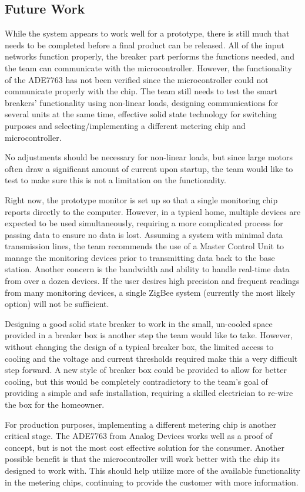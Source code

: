 \subsection{Future Work}
While the system appears to work well for a prototype, there is still much that needs to be completed before a final product can be released. All of the input networks function properly, the breaker part performs the functions needed, and the team can communicate with the microcontroller. However, the functionality of the ADE7763 has not been verified since the microcontroller could not communicate properly with the chip. The team still needs to test the smart breakers' functionality using non-linear loads, designing communications for several units at the same time, effective solid state technology for switching purposes and selecting/implementing a different metering chip and microcontroller. 

No adjustments should be necessary for non-linear loads, but since large motors often draw a significant amount of current upon startup, the team would like to test to make sure this is not a limitation on the functionality.

Right now, the prototype monitor is set up so that a single monitoring chip reports directly to the computer. However, in a typical home, multiple devices are expected to be used simultaneously, requiring a more complicated process for passing data to ensure no data is lost. Assuming a system with minimal data transmission lines, the team recommends the use of a Master Control Unit to manage the monitoring devices prior to transmitting data back to the base station. Another concern is the bandwidth and ability to handle real-time data from over a dozen devices. If the user desires high precision and frequent readings from many monitoring devices, a single ZigBee system (currently the most likely option) will not be sufficient.

Designing a good solid state breaker to work in the small, un-cooled space provided in a breaker box is another step the team would like to take. However, without changing the design of a typical breaker box, the limited access to cooling and the voltage and current thresholds required make this a very difficult step forward. A new style of breaker box could be provided to allow for better cooling, but this would be completely contradictory to the team's goal of providing a simple and safe installation, requiring a skilled electrician to re-wire the box for the homeowner. 
 
For production purposes, implementing a different metering chip is another critical stage. The ADE7763 from Analog Devices works well as a proof of concept, but is not the most cost effective solution for the consumer. Another possible benefit is that the microcontroller will work better with the chip its designed to work with. This should help utilize more of the available functionality in the metering chips, continuing to provide the customer with more information. 
